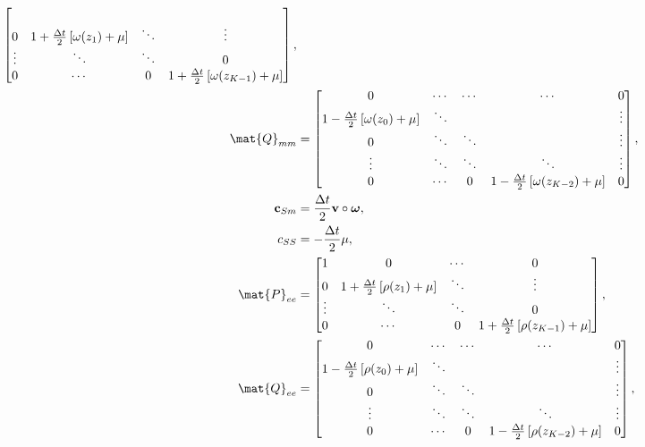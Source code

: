 \documentclass{jpmarticle}
\renewcommand{\vec}[1]{\boldsymbol{\mathrm{#1}}}
\let\subequationsorig\subequations%
\let\endsubequationsorig\endsubequations%
\renewenvironment{subequations}{
  \subequationsorig
  \renewcommand{\theequation}{\theparentequation.\arabic{equation}}
}{
  \endsubequationsorig
}
\begin{document}
\begin{subequations}
\begin{align}
\begin{bmatrix}
      \\
      0 & 1 + \frac{\Delta t}{2} \left[\omega(z_1) + \mu\right] &
      \ddots & \vdots
      \\
      \vdots & \ddots & \ddots & 0
      \\
      0 & \cdots & 0 &
      1 + \frac{\Delta t}{2} \left[\omega(z_{K - 1}) + \mu\right]
    \end{bmatrix},
    \\
    \mat{Q}_{mm} &=
    \begin{bmatrix}
      0 & \cdots & \cdots & \cdots & 0
      \\
      1 - \frac{\Delta t}{2} \left[\omega(z_0) + \mu\right] & \ddots &
      & & \vdots
      \\
      0 & \ddots & \ddots & & \vdots
      \\
      \vdots & \ddots & \ddots & \ddots & \vdots
      \\
      0 & \cdots & 0 &
      1 - \frac{\Delta t}{2} \left[\omega(z_{K - 2}) + \mu\right] & 0
    \end{bmatrix},
    \\
    \vec{c}_{Sm} &=
    \frac{\Delta t}{2} \vec{v} \circ \vec{\omega},
    \\
    c_{SS} &= - \frac{\Delta t}{2} \mu,
    \\
    \mat{P}_{ee} &=
    \begin{bmatrix}
      1 & 0 & \cdots & 0
      \\
      0 & 1 + \frac{\Delta t}{2} \left[\rho(z_1) + \mu\right] &
      \ddots & \vdots
      \\
      \vdots & \ddots & \ddots & 0
      \\
      0 & \cdots & 0 &
      1 + \frac{\Delta t}{2} \left[\rho(z_{K - 1}) + \mu\right]
    \end{bmatrix},
    \\
    \mat{Q}_{ee} &=
    \begin{bmatrix}
      0 & \cdots & \cdots & \cdots & 0
      \\
      1 - \frac{\Delta t}{2} \left[\rho(z_0) + \mu\right] & \ddots &
      & & \vdots
      \\
      0 & \ddots & \ddots & & \vdots
      \\
      \vdots & \ddots & \ddots & \ddots & \vdots
      \\
      0 & \cdots & 0 &
      1 - \frac{\Delta t}{2} \left[\rho(z_{K - 2}) + \mu\right] & 0
    \end{bmatrix},
    \\

\end{align}
\end{subequations}
\end{document}
